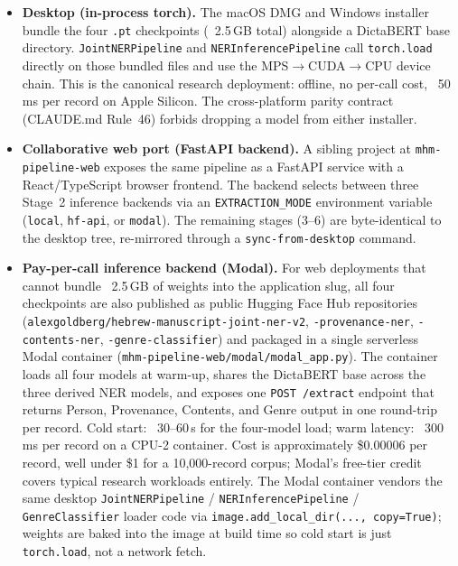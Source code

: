 \documentclass[12pt]{article}
\newcommand{\code}[1]{\texttt{#1}}
\begin{document}
\begin{itemize}
\item \textbf{Desktop (in-process torch).} The macOS DMG and Windows installer bundle the four \code{.pt} checkpoints (~2.5\,GB total) alongside a DictaBERT base directory. \code{JointNERPipeline} and \code{NERInferencePipeline} call \code{torch.load} directly on those bundled files and use the MPS$\rightarrow$CUDA$\rightarrow$CPU device chain. This is the canonical research deployment: offline, no per-call cost, ~50\,ms per record on Apple Silicon. The cross-platform parity contract (CLAUDE.md Rule~46) forbids dropping a model from either installer.

\item \textbf{Collaborative web port (FastAPI backend).} A sibling project at \code{mhm-pipeline-web} exposes the same pipeline as a FastAPI service with a React/TypeScript browser frontend. The backend selects between three Stage~2 inference backends via an \code{EXTRACTION\_MODE} environment variable (\code{local}, \code{hf-api}, or \code{modal}). The remaining stages (3--6) are byte-identical to the desktop tree, re-mirrored through a \code{sync-from-desktop} command.

\item \textbf{Pay-per-call inference backend (Modal).} For web deployments that cannot bundle ~2.5\,GB of weights into the application slug, all four checkpoints are also published as public Hugging Face Hub repositories (\code{alexgoldberg/hebrew-manuscript-joint-ner-v2}, \code{-provenance-ner}, \code{-contents-ner}, \code{-genre-classifier}) and packaged in a single serverless Modal container (\code{mhm-pipeline-web/modal/modal\_app.py}). The container loads all four models at warm-up, shares the DictaBERT base across the three derived NER models, and exposes one \code{POST /extract} endpoint that returns Person, Provenance, Contents, and Genre output in one round-trip per record. Cold start: ~30--60\,s for the four-model load; warm latency: ~300\,ms per record on a CPU-2 container. Cost is approximately \$0.00006 per record, well under \$1 for a 10{,}000-record corpus; Modal's free-tier credit covers typical research workloads entirely. The Modal container vendors the same desktop \code{JointNERPipeline} / \code{NERInferencePipeline} / \code{GenreClassifier} loader code via \code{image.add\_local\_dir(..., copy=True)}; weights are baked into the image at build time so cold start is just \code{torch.load}, not a network fetch.
\end{itemize}
\end{document}
